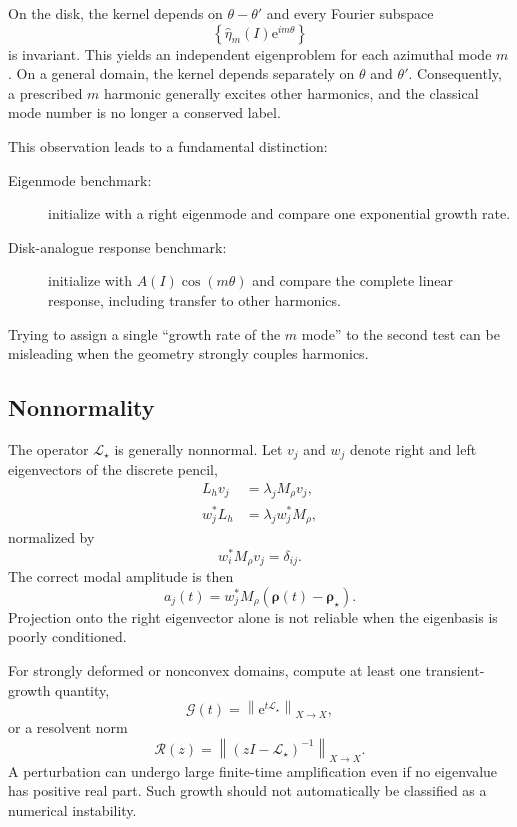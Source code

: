 \documentclass[11pt,a4paper]{article}
\newcommand{\norm}[1]{\left\|#1\right\|}
\newcommand{\Lop}{\mathcal{L}_{\star}}
\newcommand{\e}{\mathrm{e}}
\begin{document}
On the disk, the kernel depends on $\theta-\theta'$ and every Fourier subspace
\[
  \left\{\widehat\eta_m(I)\e^{im\theta}\right\}
\]
is invariant. This yields an independent eigenproblem for each azimuthal mode $m$. On a general domain, the kernel depends separately on $\theta$ and $\theta'$. Consequently, a prescribed $m$ harmonic generally excites other harmonics, and the classical mode number is no longer a conserved label.

This observation leads to a fundamental distinction:
\begin{description}
  \item[Eigenmode benchmark:] initialize with a right eigenmode and compare one exponential growth rate.
  \item[Disk-analogue response benchmark:] initialize with $A(I)\cos(m\theta)$ and compare the complete linear response, including transfer to other harmonics.
\end{description}
Trying to assign a single ``growth rate of the $m$ mode'' to the second test can be misleading when the geometry strongly couples harmonics.

\subsection{Nonnormality}

The operator $\Lop$ is generally nonnormal. Let $v_j$ and $w_j$ denote right and left eigenvectors of the discrete pencil,
\begin{align}
  L_hv_j&=\lambda_jM_\rho v_j,\\
  w_j^\ast L_h&=\lambda_jw_j^\ast M_\rho,
\end{align}
normalized by
\begin{equation}
  w_i^\ast M_\rho v_j=\delta_{ij}.
  \label{eq:biorthogonality}
\end{equation}
The correct modal amplitude is then
\begin{equation}
  a_j(t)
  =w_j^\ast M_\rho
  \left(\boldsymbol\rho(t)-\boldsymbol\rho_\star\right).
  \label{eq:left-projection}
\end{equation}
Projection onto the right eigenvector alone is not reliable when the eigenbasis is poorly conditioned.

For strongly deformed or nonconvex domains, compute at least one transient-growth quantity,
\begin{equation}
  \mathcal{G}(t)
  =\norm{\e^{t\Lop}}_{X\to X},
  \label{eq:transient-growth}
\end{equation}
or a resolvent norm
\begin{equation}
  \mathcal{R}(z)
  =\norm{(zI-\Lop)^{-1}}_{X\to X}.
  \label{eq:resolvent}
\end{equation}
A perturbation can undergo large finite-time amplification even if no eigenvalue has positive real part. Such growth should not automatically be classified as a numerical instability.
\end{document}
